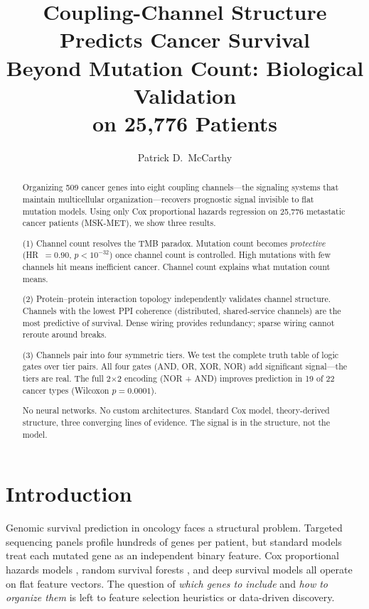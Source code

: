 \documentclass[11pt]{article}
\title{Coupling-Channel Structure Predicts Cancer Survival\\
Beyond Mutation Count: Biological Validation\\
on 25{,}776 Patients}
\author{Patrick D.\ McCarthy}
\date{}
\begin{document}
\maketitle

\begin{abstract}
Organizing 509 cancer genes into eight coupling channels---the
signaling systems that maintain multicellular organization---recovers
prognostic signal invisible to flat mutation models. Using only
Cox proportional hazards regression on 25{,}776 metastatic cancer
patients (MSK-MET), we show three results.

(1) Channel count resolves the TMB paradox. Mutation count
becomes \emph{protective} (HR~$= 0.90$, $p < 10^{-32}$) once
channel count is controlled. High mutations with few channels hit
means inefficient cancer. Channel count explains what mutation
count means.

(2) Protein--protein interaction topology independently validates
channel structure. Channels with the lowest PPI coherence
(distributed, shared-service channels) are the most predictive of
survival. Dense wiring provides redundancy; sparse wiring cannot
reroute around breaks.

(3) Channels pair into four symmetric tiers. We test the
complete truth table of logic gates over tier pairs. All four
gates (AND, OR, XOR, NOR) add significant signal---the tiers are
real. The full 2$\times$2 encoding (NOR + AND) improves
prediction in 19 of 22 cancer types (Wilcoxon $p = 0.0001$).

No neural networks. No custom architectures. Standard Cox model,
theory-derived structure, three converging lines of evidence.
The signal is in the structure, not the model.
\end{abstract}

\section{Introduction}
\label{sec:intro}

Genomic survival prediction in oncology faces a structural
problem. Targeted sequencing panels profile hundreds of genes per
patient, but standard models treat each mutated gene as an
independent binary feature. Cox proportional hazards models
\cite{Cox1972}, random survival forests \cite{Ishwaran2008}, and
deep survival models \cite{Katzman2018} all operate on flat
feature vectors. The question of \emph{which genes to include}
and \emph{how to organize them} is left to feature selection
heuristics or data-driven discovery.
\end{document}
